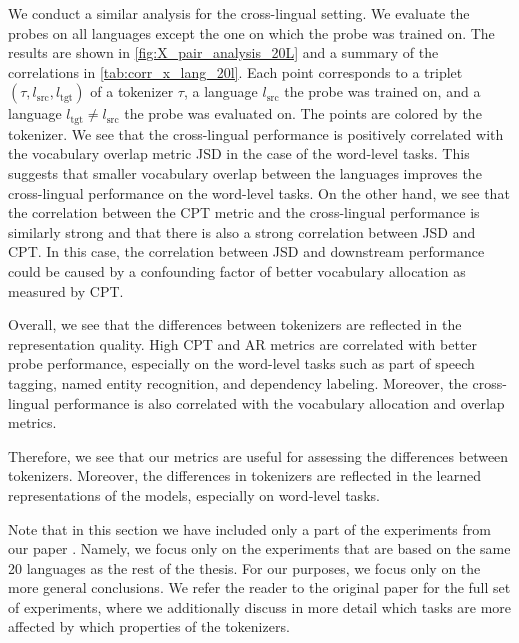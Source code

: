 We conduct a similar analysis for the cross-lingual setting. We evaluate the probes on all languages except the one on which the probe was trained on. The results are shown in \autoref{fig:X_pair_analysis_20L} and a summary of the correlations in \autoref{tab:corr_x_lang_20l}. Each point corresponds to a triplet $(\tau, l_\mathrm{src}, l_\mathrm{tgt})$ of a tokenizer $\tau$, a language $l_\mathrm{src}$ the probe was trained on, and a language $l_\mathrm{tgt} \neq l_\mathrm{src}$ the probe was evaluated on. The points are colored by the tokenizer. We see that the cross-lingual performance is positively correlated with the vocabulary overlap metric JSD in the case of the word-level tasks. This suggests that smaller vocabulary overlap between the languages improves the cross-lingual performance on the word-level tasks. On the other hand, we see that the correlation between the CPT metric and the cross-lingual performance is similarly strong and that there is also a strong correlation between JSD and CPT. In this case, the correlation between JSD and downstream performance could be caused by a confounding factor of better vocabulary allocation as measured by CPT.

Overall, we see that the differences between tokenizers are reflected in the representation quality. High CPT and AR metrics are correlated with better probe performance, especially on the word-level tasks such as part of speech tagging, named entity recognition, and dependency labeling. Moreover, the cross-lingual performance is also correlated with the vocabulary allocation and overlap metrics. 

Therefore, we see that our metrics are useful for assessing the differences between tokenizers. Moreover, the differences in tokenizers are reflected in the learned representations of the models, especially on word-level tasks.

Note that in this section we have included only a part of the experiments from our paper \citet{limisiewicz_tokenization_2023}.
 Namely, we focus only on the experiments that are based on the same 20 languages as the rest of the thesis. For our purposes, we focus only on the more general conclusions. We refer the reader to the original paper for the full set of experiments, where we additionally discuss in more detail which tasks are more affected by which properties of the tokenizers.




